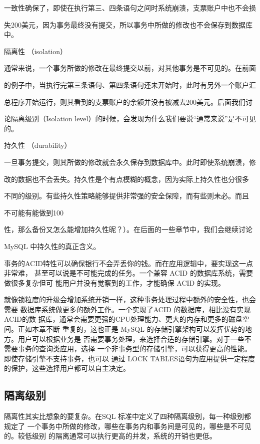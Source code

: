 一致性确保了，即使在执行第三、四条语句之间时系统崩溃，支票账户中也不会损

失200美元，因为事务最终没有提交，所以事务中所做的修改也不会保存到数据库中。

隔离性 （isolation）

通常来说，一个事务所做的修改在最终提交以前，对其他事务是不可见的。在前面

的例子中，当执行完第三条语句、第四条语句还未开始时，此时有另外一个账户汇

总程序开始运行，则其看到的支票账户的余额并没有被减去200美元。后面我们讨

论隔离级别（Isolation level）的时候，会发现为什么我们要说“通常来说”是不可见的。

持久性 （durability）

一旦事务提交，则其所做的修改就会永久保存到数据库中。此时即使系统崩溃，修

改的数据也不会丢失。持久性是个有点模糊的概念，因为实际上持久性也分很多

不同的级别。有些持久性策略能够提供非常强的安全保障，而有些则未必。而且

不可能有能做到100%

性，那么备份又怎么能增加持久性昵？）。在后面的一些章节中，我们会继续讨论

MySQL 中持久性的真正含义。

事务的ACID特性可以确保银行不会弄丢你的钱。而在应用逻辑中，要实现这一点非常难，
甚至可以说是不可能完成的任务。一个兼容 ACID 的数据库系统，需要做很多复杂但可
能用户并没有觉察到的工作，才能确保 ACID 的实现。

就像锁粒度的升级会增加系统开销一样，这种事务处理过程中额外的安全性，也会需要
数据库系统做更多的额外工作。一个实现了ACID 的数据库，相比没有实现ACID的数
据库，通常会需要更强的CPU处理能力、更大的内存和更多的磁盘空间。正如本章不断
重复的，这也正是 MySQL 的存储引擎架构可以发挥优势的地方。用户可以根据业务是
否需要事务处理，来选择合适的存储引擎。对于一些不需要事务的查询类应用，选择
一个非事务型的存储引擎，可以获得更高的性能。即使存储引擎不支持事务，也可以
通过 LOCK TABLES语句为应用提供一定程度的保护，这些选择用户都可以自主决定。

\subsection{隔离级别}
隔离性其实比想象的要复杂。在SQL 标准中定义了四种隔离级别，每一种级别都规定了
一个事务中所做的修改，哪些在事务内和事务间是可见的，哪些是不可见的。较低级别
的隔离通常可以执行更高的并发，系统的开销也更低。

